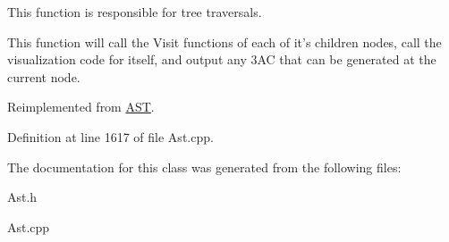 This function is responsible for tree traversals. 

This function will call the Visit functions of each of it's children nodes, call the visualization code for itself, and output any 3\-A\-C that can be generated at the current node. 

Reimplemented from \hyperlink{classAST_a5828cc86f2c4f1a0aeab6d7069e8fd82}{A\-S\-T}.



Definition at line 1617 of file Ast.\-cpp.



The documentation for this class was generated from the following files\-:\begin{DoxyCompactItemize}
\item 
Ast.\-h\item 
Ast.\-cpp\end{DoxyCompactItemize}
